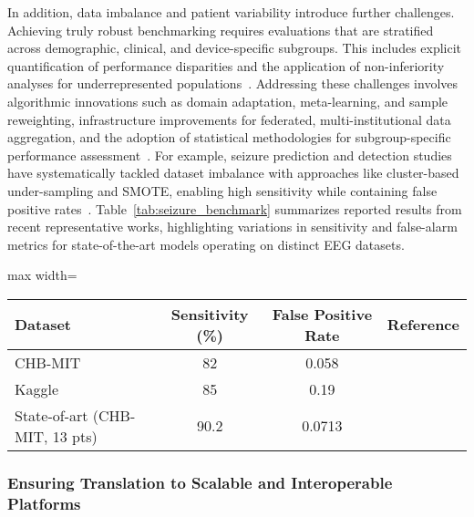 \documentclass[sigconf]{acmart}
\begin{document}
In addition, data imbalance and patient variability introduce further challenges. Achieving truly robust benchmarking requires evaluations that are stratified across demographic, clinical, and device-specific subgroups. This includes explicit quantification of performance disparities and the application of non-inferiority analyses for underrepresented populations~\cite{ref89,ref106}. Addressing these challenges involves algorithmic innovations such as domain adaptation, meta-learning, and sample reweighting, infrastructure improvements for federated, multi-institutional data aggregation, and the adoption of statistical methodologies for subgroup-specific performance assessment~\cite{ref102,ref103}. For example, seizure prediction and detection studies have systematically tackled dataset imbalance with approaches like cluster-based under-sampling and SMOTE, enabling high sensitivity while containing false positive rates~\cite{ref102,ref103}. Table~\ref{tab:seizure_benchmark} summarizes reported results from recent representative works, highlighting variations in sensitivity and false-alarm metrics for state-of-the-art models operating on distinct EEG datasets.

\begin{table*}[htbp]
\centering
\caption{Performance benchmarking of recent seizure prediction and detection models on representative EEG datasets.}
\label{tab:seizure_benchmark}
\begin{adjustbox}{max width=\textwidth}
\begin{tabular}{@{}lccc@{}}
\toprule
Dataset & Sensitivity (\%) & False Positive Rate & Reference \\
\midrule
CHB-MIT & 82 & 0.058 & \cite{ref102} \\
Kaggle & 85 & 0.19 & \cite{ref102} \\
State-of-art (CHB-MIT, 13 pts) & 90.2 & 0.0713 & \cite{ref102} \\
\bottomrule
\end{tabular}
\end{adjustbox}
\end{table*}

\subsubsection{Ensuring Translation to Scalable and Interoperable Platforms}
\end{document}

